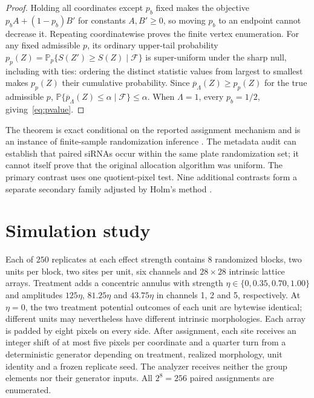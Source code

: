 \documentclass[11pt]{article}
\theoremstyle{plain}
\theoremstyle{definition}
\numberwithin{equation}{section}
\newcommand{\Prob}{\mathbb P}
\newcommand{\1}{\mathbf 1}
\providecommand{\SimReplicatesPerEffect}{250}
\providecommand{\SimBlocks}{8}
\providecommand{\SimPermutationCount}{256}
\begin{document}
\begin{proof}
Holding all coordinates except $p_b$ fixed makes the objective
$p_bA+(1-p_b)B'$ for constants $A,B'\ge0$, so moving $p_b$ to an endpoint
cannot decrease it. Repeating coordinatewise proves the finite vertex
enumeration. For any fixed admissible $p$, its ordinary upper-tail probability
$p_p(Z)=\Prob_p\{S(Z')\ge S(Z)\mid\mathcal F\}$ is super-uniform under the
sharp null, including with ties: ordering the distinct statistic values from
largest to smallest makes $p_p(Z)$ their cumulative probability. Since
$\overline p_\Lambda(Z)\ge p_p(Z)$ for the true admissible $p$,
$\Prob\{\overline p_\Lambda(Z)\le\alpha\mid\mathcal F\}\le\alpha$.
When $\Lambda=1$, every $p_b=1/2$, giving~\eqref{eq:pvalue}.
\end{proof}

The theorem is exact conditional on the reported assignment mechanism and is an instance of finite-sample randomization inference \citep{Fisher1935,LehmannRomano2005}. The metadata audit can establish that paired siRNAs occur within the same plate randomization set; it cannot itself prove that the original allocation algorithm was uniform. The primary contrast uses one quotient-pixel test. Nine additional contrasts form a separate secondary family adjusted by Holm's method \citep{Holm1979}.

\section{Simulation study}\label{sec:simulation}

Each of $\SimReplicatesPerEffect$ replicates at each effect strength contains
$\SimBlocks$ randomized blocks, two units per block, two sites per unit, six
channels and $28\times28$ intrinsic lattice arrays. Treatment adds a concentric
annulus with strength $\eta\in\{0,0.35,0.70,1.00\}$ and amplitudes
$125\eta$, $81.25\eta$ and $43.75\eta$ in channels 1, 2 and 5,
respectively. At $\eta=0$, the two treatment potential outcomes of each unit
are bytewise identical; different units may nevertheless have different
intrinsic morphologies. Each array is padded by eight pixels on every side.
After assignment, each site receives an integer shift of at most five pixels
per coordinate and a quarter turn from a deterministic generator depending on
treatment, realized morphology, unit identity and a frozen replicate seed.
The analyzer receives neither the group elements nor their generator inputs.
All $2^{\SimBlocks}=\SimPermutationCount$ paired assignments are enumerated.
\end{document}

